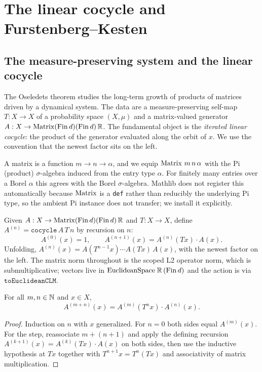 \chapter{The linear cocycle and Furstenberg--Kesten}
\label{chap:cocycle}

\section{The measure-preserving system and the linear cocycle}

The Oseledets theorem studies the long-term growth of products of matrices driven by a
dynamical system. The data are a measure-preserving self-map \(T : X \to X\) of a
probability space \((X,\mu)\) and a matrix-valued generator
\(A : X \to \operatorname{Matrix}(\operatorname{Fin} d)(\operatorname{Fin} d)\,\mathbb{R}\). The fundamental object is the
\emph{iterated linear cocycle}: the product of the generator evaluated along the orbit
of \(x\). We use the convention that the newest factor sits on the left.

\begin{definition}\label{instMeasurableSpaceMatrix}
  \leanok
  A matrix is a function \(m \to n \to \alpha\), and we equip
  \(\operatorname{Matrix}\, m\, n\, \alpha\) with the Pi (product) \(\sigma\)-algebra induced from the
  entry type \(\alpha\). For finitely many entries over a Borel \(\alpha\) this agrees
  with the Borel \(\sigma\)-algebra. Mathlib does not register this automatically because
  \(\operatorname{Matrix}\) is a \texttt{def} rather than reducibly the underlying Pi type, so the
  ambient Pi instance does not transfer; we install it explicitly.
\end{definition}

\begin{definition}\label{cocycle}
  \leanok
  Given \(A : X \to \operatorname{Matrix}(\operatorname{Fin} d)(\operatorname{Fin} d)\,\mathbb{R}\) and \(T : X \to X\), define
  \(A^{(n)} = \texttt{cocycle}\,A\,T\,n\) by recursion on \(n\):
  \[
    A^{(0)}(x) = 1, \qquad A^{(n+1)}(x) = A^{(n)}(Tx)\cdot A(x).
  \]
  Unfolding, \(A^{(n)}(x) = A(T^{n-1}x)\cdots A(Tx)\,A(x)\), with the newest factor on
  the left. The matrix norm throughout is the scoped L2 operator norm, which is
  submultiplicative; vectors live in \(\mathrm{EuclideanSpace}\;\mathbb{R}\,(\operatorname{Fin} d)\) and the
  action is via \(\texttt{toEuclideanCLM}\).
\end{definition}

\begin{theorem}\label{cocycle_add}
  \leanok
  For all \(m, n \in \mathbb{N}\) and \(x \in X\),
  \[
    A^{(m+n)}(x) = A^{(m)}(T^{n}x)\cdot A^{(n)}(x).
  \]
\end{theorem}
\begin{proof}\leanok
  Induction on \(n\) with \(x\) generalized. For \(n = 0\) both sides equal \(A^{(m)}(x)\).
  For the step, reassociate \(m + (n+1)\) and apply the defining recursion
  \(A^{(k+1)}(x) = A^{(k)}(Tx)\cdot A(x)\) on both sides, then use the inductive
  hypothesis at \(Tx\) together with \(T^{n+1}x = T^{n}(Tx)\) and associativity of matrix
  multiplication.
\end{proof}

